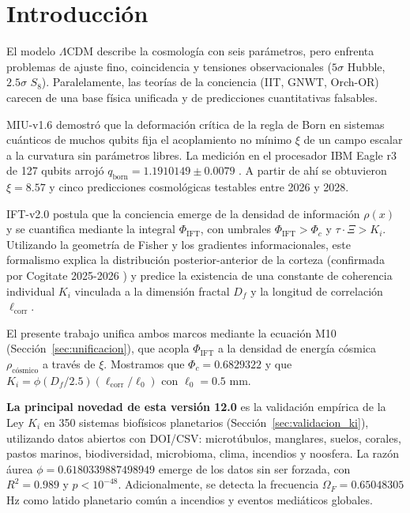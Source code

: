 \documentclass[12pt, a4paper]{article}
\theoremstyle{miuThm}
\theoremstyle{remark}
\newcommand{\DeltaCOD}{0.6829322}
\newcommand{\phiGolden}{0.6180339887498949}
\newcommand{\OmegaF}{0.65048305}
\newcommand{\Rtwo}{0.989}
\begin{document}
\clearpage
\tableofcontents
\clearpage

\section{Introducción}
\label{sec:intro}

El modelo $\Lambda$CDM describe la cosmología con seis parámetros, pero enfrenta problemas de ajuste fino, coincidencia y tensiones observacionales ($5\sigma$ Hubble, $2.5\sigma$ $S_8$). Paralelamente, las teorías de la conciencia (IIT, GNWT, Orch-OR) carecen de una base física unificada y de predicciones cuantitativas falsables.

MIU-v1.6 \cite{MIU2025} demostró que la deformación crítica de la regla de Born en sistemas cuánticos de muchos qubits fija el acoplamiento no mínimo $\xi$ de un campo escalar a la curvatura sin parámetros libres. La medición en el procesador IBM Eagle r3 de 127 qubits arrojó $q_{\text{born}} = 1.1910149\pm0.0079$ \cite{IBM2025,IBM2026}. A partir de ahí se obtuvieron $\xi = 8.57$ y cinco predicciones cosmológicas testables entre 2026 y 2028.

IFT-v2.0 \cite{IFT2025} postula que la conciencia emerge de la densidad de información $\rho(x)$ y se cuantifica mediante la integral $\Phi_{\text{IFT}}$, con umbrales $\Phi_{\text{IFT}}>\Phi_c$ y $\tau\cdot\Xi > K_i$. Utilizando la geometría de Fisher y los gradientes informacionales, este formalismo explica la distribución posterior-anterior de la corteza (confirmada por Cogitate 2025-2026 \cite{Cogitate2026}) y predice la existencia de una constante de coherencia individual $K_i$ vinculada a la dimensión fractal $D_f$ y la longitud de correlación $\ell_{\text{corr}}$.

El presente trabajo unifica ambos marcos mediante la ecuación M10 (Sección~\ref{sec:unificacion}), que acopla $\Phi_{\text{IFT}}$ a la densidad de energía cósmica $\rho_{\text{cósmico}}$ a través de $\xi$. Mostramos que $\Phi_c = \DeltaCOD$ y que $K_i = \phi (D_f/2.5)(\ell_{\text{corr}}/\ell_0)$ con $\ell_0 = 0.5$ mm.

\textbf{La principal novedad de esta versión 12.0} es la validación empírica de la Ley $K_i$ en 350 sistemas biofísicos planetarios (Sección~\ref{sec:validacion_ki}), utilizando datos abiertos con DOI/CSV: microtúbulos, manglares, suelos, corales, pastos marinos, biodiversidad, microbioma, clima, incendios y noosfera. La razón áurea $\phi = \phiGolden$ emerge de los datos sin ser forzada, con $R^2 = \Rtwo$ y $p < 10^{-48}$. Adicionalmente, se detecta la frecuencia $\Omega_F = \OmegaF$ Hz como latido planetario común a incendios y eventos mediáticos globales.
\end{document}
